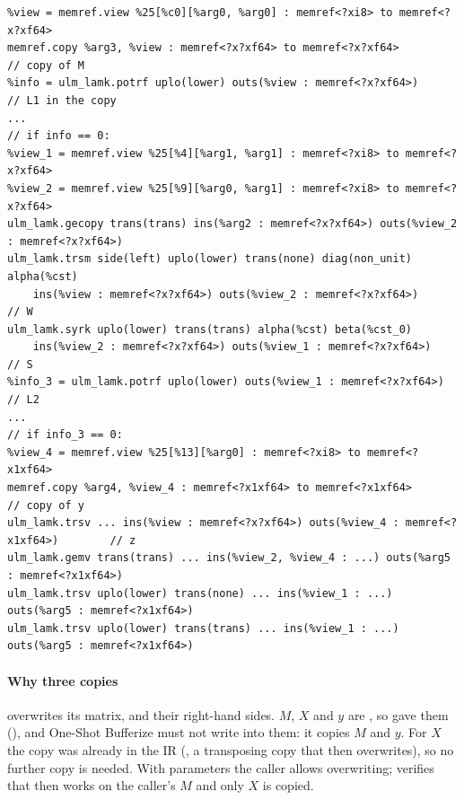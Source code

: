 \begin{lstlisting}
%view = memref.view %25[%c0][%arg0, %arg0] : memref<?xi8> to memref<?x?xf64>
memref.copy %arg3, %view : memref<?x?xf64> to memref<?x?xf64>          // copy of M
%info = ulm_lamk.potrf uplo(lower) outs(%view : memref<?x?xf64>)        // L1 in the copy
...                                                                     // if info == 0:
%view_1 = memref.view %25[%4][%arg1, %arg1] : memref<?xi8> to memref<?x?xf64>
%view_2 = memref.view %25[%9][%arg0, %arg1] : memref<?xi8> to memref<?x?xf64>
ulm_lamk.gecopy trans(trans) ins(%arg2 : memref<?x?xf64>) outs(%view_2 : memref<?x?xf64>)
ulm_lamk.trsm side(left) uplo(lower) trans(none) diag(non_unit) alpha(%cst)
    ins(%view : memref<?x?xf64>) outs(%view_2 : memref<?x?xf64>)       // W
ulm_lamk.syrk uplo(lower) trans(trans) alpha(%cst) beta(%cst_0)
    ins(%view_2 : memref<?x?xf64>) outs(%view_1 : memref<?x?xf64>)     // S
%info_3 = ulm_lamk.potrf uplo(lower) outs(%view_1 : memref<?x?xf64>)   // L2
...                                                                     // if info_3 == 0:
%view_4 = memref.view %25[%13][%arg0] : memref<?xi8> to memref<?x1xf64>
memref.copy %arg4, %view_4 : memref<?x1xf64> to memref<?x1xf64>        // copy of y
ulm_lamk.trsv ... ins(%view : memref<?x?xf64>) outs(%view_4 : memref<?x1xf64>)        // z
ulm_lamk.gemv trans(trans) ... ins(%view_2, %view_4 : ...) outs(%arg5 : memref<?x1xf64>)
ulm_lamk.trsv uplo(lower) trans(none) ... ins(%view_1 : ...) outs(%arg5 : memref<?x1xf64>)
ulm_lamk.trsv uplo(lower) trans(trans) ... ins(%view_1 : ...) outs(%arg5 : memref<?x1xf64>)
\end{lstlisting}

\paragraph{Why three copies}  overwrites its matrix, 
and  their right-hand sides. \(M\), \(X\) and \(y\) are
, so  gave them
(), and One-Shot
Bufferize must not write into them: it copies \(M\) and \(y\). For \(X\)
the copy was already in the IR (, a transposing copy that
 then overwrites), so no further copy is needed. With
 parameters the caller allows overwriting;
 verifies that  then works on the
caller's \(M\) and only \(X\) is copied.

